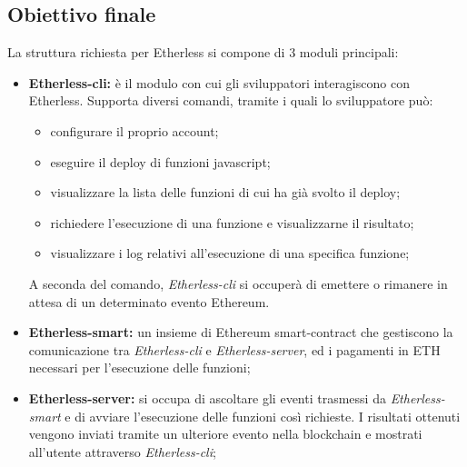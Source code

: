 \subsection{Obiettivo finale}
La struttura richiesta per Etherless si compone di 3 moduli principali: 
\begin{itemize}
	\item \textbf{Etherless-cli}\textbf{:} è il modulo con cui gli sviluppatori interagiscono con Etherless. Supporta diversi comandi, tramite i quali lo sviluppatore può: 
		\begin{itemize}
			\item configurare il proprio account; 
			\item eseguire il deploy di funzioni javascript; 
			\item visualizzare la lista delle funzioni di cui ha già svolto il deploy; 
			\item richiedere l'esecuzione di una funzione e visualizzarne il risultato; 
			\item visualizzare i log relativi all'esecuzione di una specifica funzione; 
		\end{itemize}  
	A seconda del comando, \textit{Etherless-cli} si occuperà di emettere o rimanere in attesa di un determinato evento Ethereum. 
	
	\item \textbf{Etherless-smart:} un insieme di Ethereum smart-contract che gestiscono la comunicazione tra \textit{Etherless-cli} e \textit{Etherless-server}, ed i pagamenti in ETH necessari per l'esecuzione delle funzioni; 
	\item \textbf{Etherless-server:} si occupa di ascoltare gli eventi trasmessi da \textit{Etherless-smart} e di avviare l'esecuzione delle funzioni così richieste. I risultati ottenuti vengono inviati tramite un ulteriore evento nella blockchain e mostrati all'utente attraverso \textit{Etherless-cli};  
\end{itemize}


